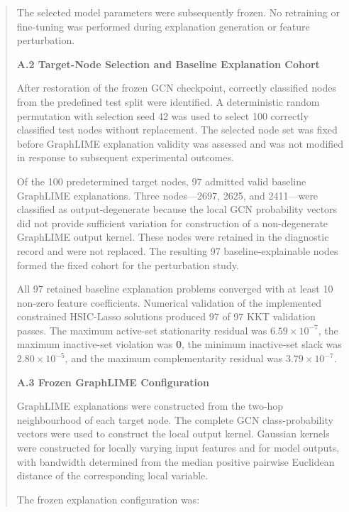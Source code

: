\documentclass[a4paper]{article}
\begin{document}
\begin{quote}
The selected model parameters were subsequently frozen. No retraining or
fine-tuning was performed during explanation generation or feature
perturbation.

\textbf{A.2 Target-Node Selection and Baseline Explanation Cohort}

After restoration of the frozen GCN checkpoint, correctly classified
nodes from the predefined test split were identified. A deterministic
random permutation with selection seed 42 was used to select 100
correctly classified test nodes without replacement. The selected node
set was fixed before GraphLIME explanation validity was assessed and was
not modified in response to subsequent experimental outcomes.

Of the 100 predetermined target nodes, 97 admitted valid baseline
GraphLIME explanations. Three nodes---2697, 2625, and 2411---were
classified as output-degenerate because the local GCN probability
vectors did not provide sufficient variation for construction of a
non-degenerate GraphLIME output kernel. These nodes were retained in the
diagnostic record and were not replaced. The resulting 97
baseline-explainable nodes formed the fixed cohort for the perturbation
study.

All 97 retained baseline explanation problems converged with at least 10
non-zero feature coefficients. Numerical validation of the implemented
constrained HSIC-Lasso solutions produced 97 of 97 KKT validation
passes. The maximum active-set stationarity residual was
\textbf{\(6.59 \times 10^{-7}\)}, the maximum inactive-set violation was
\textbf{0}, the minimum inactive-set slack was
\textbf{\(2.80 \times 10^{-5}\)}, and the maximum complementarity
residual was \textbf{\(3.79 \times 10^{-7}\)}.

\textbf{A.3 Frozen GraphLIME Configuration}

GraphLIME explanations were constructed from the two-hop neighbourhood
of each target node. The complete GCN class-probability vectors were
used to construct the local output kernel. Gaussian kernels were
constructed for locally varying input features and for model outputs,
with bandwidth determined from the median positive pairwise Euclidean
distance of the corresponding local variable.

The frozen explanation configuration was:
\end{quote}
\end{document}
